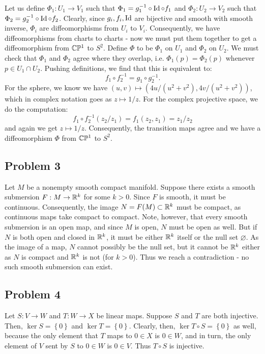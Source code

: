 \documentclass{../../mathnotes}
\begin{document}
\begin{enumerate}[(a)]
        Let us define $\Phi_1:U_1\to V_1$ such that $\Phi_1=g_1^{-1}\circ \operatorname{Id}\circ f_1$ and $\Phi_2:U_2\to V_2$ such that
        $\Phi_2=g_2^{-1}\circ\operatorname{Id}\circ f_2$. Clearly, since $g_i,f_i,\operatorname{Id}$ are bijective and smooth with smooth inverse, $\Phi_i$ are diffeomorphisms
        from $U_i$ to $V_i$. Consequently, we have diffeomorphisms from charts to charts - now we must put them together to get
        a diffeomorphism from $\mathbb{C}\mathbb{P}^1$ to $S^2$. Define $\Phi$ to be $\Phi_1$ on $U_1$ and $\Phi_2$ on $U_2$. We must check that
        $\Phi_1$ and $\Phi_2$ agree where they overlap, i.e. $\Phi_1(p)=\Phi_2(p)$ whenever $p\in U_1\cap U_2$. Pushing definitions,
        we find that this is equivalent to:
        \[f_1\circ f_2^{-1}=g_1\circ g_2^{-1}.\]
        For the sphere, we know we have $(u,v)\mapsto (4u/(u^2+v^2),4v/(u^2+v^2))$, which in complex notation goes as
        $z\mapsto 1/z$. For the complex projective space, we do the computation:
        \[f_1\circ f_2^{-1}(z_2/z_1)=f_1(z_2,z_1)=z_1/z_2\]
        and again we get $z\mapsto 1/z$. Consequently, the transition maps agree and we have a diffeomorphism $\Phi$ from
        $\mathbb{C}\mathbb{P}^1$ to $S^2$.
\end{enumerate}

\subsection*{Problem 3}

Let $M$ be a nonempty smooth compact manifold. Suppose there exists a smooth submersion
$F:M\to\mathbb{R}^k$ for some $k>0$. Since $F$ is smooth, it must be continuous. Consequently,
the image $N=F(M)\subset\mathbb{R}^k$ must be compact, as continuous maps take compact to compact.
Note, however, that every smooth submersion is an open map, and since $M$ is open, $N$
must be open as well. But if $N$ is both open and closed in $\mathbb{R}^k$, it must be either
$\mathbb{R}^k$ itself or the null set $\varnothing$. As the image of a map, $N$ cannot possibly
be the null set, but it cannot be $\mathbb{R}^k$ either as $N$ is compact and $\mathbb{R}^k$ is not
(for $k>0$).  Thus we reach a contradiction - no such smooth submersion can exist.

\subsection*{Problem 4}

Let $S:V\to W$ and $T:W\to X$ be linear maps. Suppose $S$ and $T$ are both injective.
Then, $\ker S=\left\{ 0 \right\}$ and $\ker T=\left\{ 0 \right\}$. Clearly, then,
$\ker T\circ S=\left\{ 0 \right\}$ as well, because the only element that $T$ maps
to $0\in X$ is $0\in W$, and in turn, the only element of $V$ sent by $S$ to $0\in W$
is $0\in V$. Thus $T\circ S$ is injective.
\end{document}
